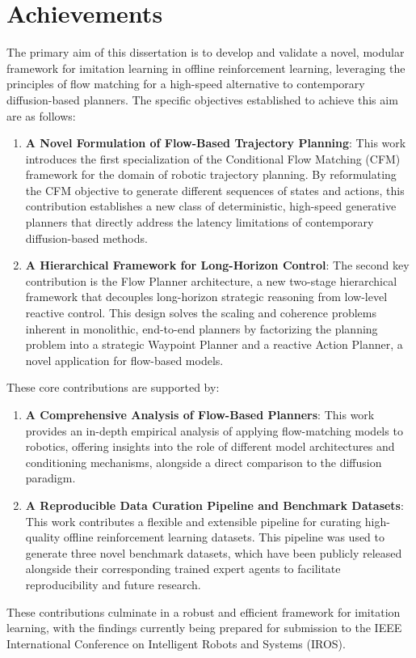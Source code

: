 \section{Achievements}
The primary aim of this dissertation is to develop and validate a novel, modular framework for imitation learning in offline reinforcement learning, leveraging the principles of flow matching for a high-speed alternative to contemporary diffusion-based planners. The specific objectives established to achieve this aim are as follows:
\begin{enumerate}
	\item \textbf{A Novel Formulation of Flow-Based Trajectory Planning}: This work introduces the first specialization of the Conditional Flow Matching (CFM) framework for the domain of robotic trajectory planning. By reformulating the CFM objective to generate different sequences of states and actions, this contribution establishes a new class of deterministic, high-speed generative planners that directly address the latency limitations of contemporary diffusion-based methods.
	\item \textbf{A Hierarchical Framework for Long-Horizon Control}: The second key contribution is the Flow Planner architecture, a new two-stage hierarchical framework that decouples long-horizon strategic reasoning from low-level reactive control. This design solves the scaling and coherence problems inherent in monolithic, end-to-end planners by factorizing the planning problem into a strategic Waypoint Planner and a reactive Action Planner, a novel application for flow-based models.
\end{enumerate}

These core contributions are supported by:

\begin{enumerate}
	\item \textbf{A Comprehensive Analysis of Flow-Based Planners}: This work provides an in-depth empirical analysis of applying flow-matching models to robotics, offering insights into the role of different model architectures and conditioning mechanisms, alongside a direct comparison to the diffusion paradigm.
	\item \textbf{A Reproducible Data Curation Pipeline and Benchmark Datasets}: This work contributes a flexible and extensible pipeline for curating high-quality offline reinforcement learning datasets. This pipeline was used to generate three novel benchmark datasets, which have been publicly released alongside their corresponding trained expert agents to facilitate reproducibility and future research.	
\end{enumerate}
These contributions culminate in a robust and efficient framework for imitation learning, with the findings currently being prepared for submission to the IEEE International Conference on Intelligent Robots and Systems (IROS).


